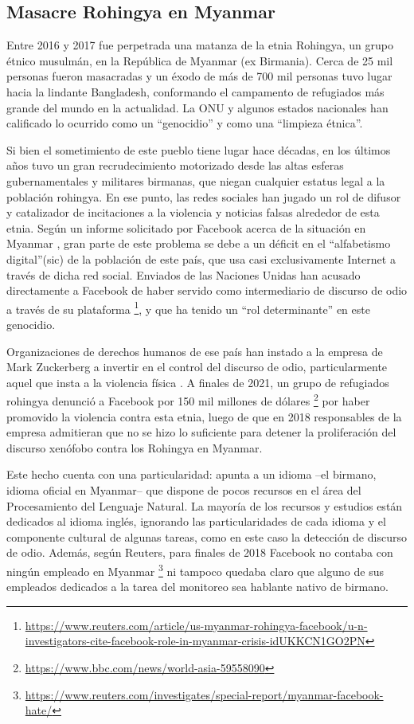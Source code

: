 \subsection{Masacre Rohingya en Myanmar}
%
Entre 2016 y 2017 fue perpetrada una matanza de la etnia Rohingya, un grupo étnico musulmán, en la República de Myanmar (ex Birmania). Cerca de 25 mil personas fueron masacradas y un éxodo de más de 700 mil personas tuvo lugar hacia la lindante Bangladesh, conformando el campamento de refugiados más grande del mundo en la actualidad. La ONU y algunos estados nacionales han calificado lo ocurrido como un ``genocidio'' y como una ``limpieza étnica''.


Si bien el sometimiento de este pueblo tiene lugar hace décadas, en los últimos años tuvo un gran recrudecimiento motorizado desde las altas esferas gubernamentales y militares birmanas, que niegan cualquier estatus legal a la población rohingya. En ese punto, las redes sociales han jugado un rol de difusor y catalizador de incitaciones a la violencia y noticias falsas alrededor de esta etnia. Según un informe solicitado por Facebook acerca de la situación en Myanmar \cite{warofka2018independent}, gran parte de este problema se debe a un déficit en el ``alfabetismo digital''(sic) de la población de este país, que usa casi exclusivamente Internet a través de dicha red social. Enviados de las Naciones Unidas han acusado directamente a Facebook de haber servido como intermediario de discurso de odio a través de su plataforma \footnote{\url{https://www.reuters.com/article/us-myanmar-rohingya-facebook/u-n-investigators-cite-facebook-role-in-myanmar-crisis-idUKKCN1GO2PN}}, y que ha tenido un ``rol determinante'' en este genocidio.

Organizaciones de derechos humanos de ese país han instado a la empresa de Mark Zuckerberg a invertir en el control del discurso de odio, particularmente aquel que insta a la violencia física \cite{irrawaddy2018zuckerberg}. A finales de 2021, un grupo de refugiados rohingya denunció a Facebook por 150 mil millones de dólares \footnote{\url{https://www.bbc.com/news/world-asia-59558090}} por haber promovido la violencia contra esta etnia, luego de que en 2018 responsables de la empresa admitieran que no se hizo lo suficiente para detener la proliferación del discurso xenófobo contra los Rohingya en Myanmar.

Este hecho cuenta con una particularidad: apunta a un idioma --el birmano, idioma oficial en Myanmar-- que dispone de pocos recursos en el área del Procesamiento del Lenguaje Natural. La mayoría de los recursos y estudios están dedicados al idioma inglés, ignorando las particularidades de cada idioma y el componente cultural de algunas tareas, como en este caso la detección de discurso de odio. Además, según Reuters, para finales de 2018 Facebook no contaba con ningún empleado en Myanmar \footnote{\url{https://www.reuters.com/investigates/special-report/myanmar-facebook-hate/}} ni tampoco quedaba claro que alguno de sus empleados dedicados a la tarea del monitoreo sea hablante nativo de birmano.


